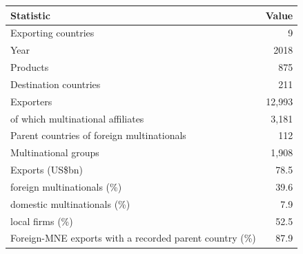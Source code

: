\begin{tabular}{lr}
\toprule
Statistic & Value \\
\midrule
Exporting countries & 9 \\
Year & 2018 \\
Products & 875 \\
Destination countries & 211 \\
Exporters & 12,993 \\
\quad of which multinational affiliates & 3,181 \\
Parent countries of foreign multinationals & 112 \\
Multinational groups & 1,908 \\
\midrule
Exports (US\$bn) & 78.5 \\
\quad foreign multinationals (\%) & 39.6 \\
\quad domestic multinationals (\%) & 7.9 \\
\quad local firms (\%) & 52.5 \\
Foreign-MNE exports with a recorded parent country (\%) & 87.9 \\
\bottomrule
\end{tabular}
